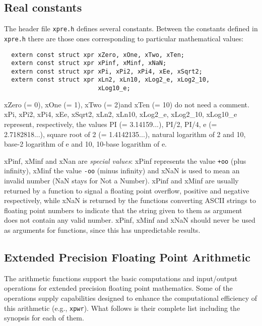 \documentclass{article}
\begin{document}
\hypertarget{toc8}{}
\subsection{Real constants}
The header file \texttt{xpre.h} defines several constants. Between the
constants defined in \texttt{xpre.h} there are those ones
corresponding to particular mathematical values:

\begin{verbatim}
  extern const struct xpr xZero, xOne, xTwo, xTen;
  extern const struct xpr xPinf, xMinf, xNaN;
  extern const struct xpr xPi, xPi2, xPi4, xEe, xSqrt2;
  extern const struct xpr xLn2, xLn10, xLog2_e, xLog2_10, 
                          xLog10_e;
\end{verbatim}
xZero (= 0), xOne (= 1), xTwo (= 2)and xTen (= 10) 
do not need a comment.
xPi, xPi2, xPi4, xEe, xSqrt2, xLn2, xLn10, xLog2\_e, xLog2\_10, xLog10\_e
represent, respectively, the values PI (= 3.14159...), PI/2, PI/4,
e (= 2.7182818...), square root of 2 (= 1.4142135...), natural
logarithm of 2 and 10, base-2 logarithm of e and 10, 10-base
logarithm of e.

xPinf, xMinf and xNan are \textit{special values}: xPinf represents the value
\texttt{+oo} (plus infinity), xMinf the value \texttt{-oo} (minus infinity) and xNaN
is used to mean an invalid number (NaN stays for Not a Number).
xPinf and xMinf are usually returned by a function to signal a
floating point overflow, positive and negative respectively, while
xNaN is returned by the functions converting ASCII strings to floating
point numbers to indicate that the string given to them as argument
does not contain any valid number.
xPinf, xMinf and xNaN should never be used as arguments for functions,
since this has unpredictable results.

\hypertarget{toc9}{}
\subsection{Extended Precision Floating Point Arithmetic}
The arithmetic functions support the basic computations and input/output
operations for extended precision floating point mathematics. Some
of the operations supply capabilities designed to enhance the computational
efficiency of this arithmetic (e.g., \texttt{xpwr}).
What follows is their complete list including the synopsis for each of them.

\begin{verbatim}
   
\end{verbatim}
\end{document}
